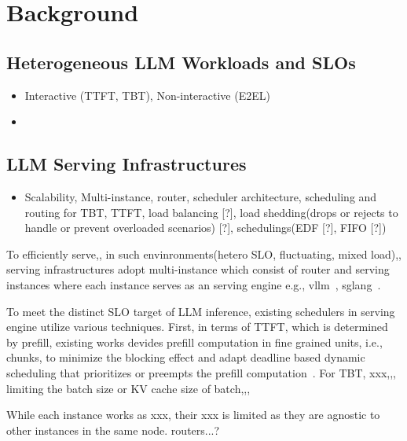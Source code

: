 
\section{Background}
\subsection{Heterogeneous LLM Workloads and SLOs}
\begin{itemize}
    \item Interactive (TTFT, TBT), Non-interactive (E2EL)
    \item {}
\end{itemize}
\subsection{LLM Serving Infrastructures}
\begin{itemize}
    \item Scalability, Multi-instance, router, scheduler architecture, scheduling and routing for TBT, TTFT, load balancing [?], load shedding(drops or rejects to handle or prevent overloaded scenarios) [?], schedulings(EDF [?], FIFO [?])
\end{itemize}
To efficiently serve,, in such envinronments(hetero SLO, fluctuating, mixed load),, serving infrastructures adopt multi-instance which consist of router and serving instances where each instance serves as an serving engine e.g., vllm~\cite{vllm}, sglang~\cite{SGLang}.

To meet the distinct SLO target of LLM inference, existing schedulers in serving engine utilize various techniques. First, in terms of TTFT, which is determined by prefill, existing works devides prefill computation in fine grained units, i.e., chunks, to minimize the blocking effect and adapt deadline based dynamic scheduling that prioritizes or preempts the prefill computation~\cite{QoServe,vllm,jitserve,sarathi_serve, Agentix}.
For TBT, xxx,,, limiting the batch size or KV cache size of batch,,,

While each instance works as xxx, their xxx is limited as they are agnostic to other instances in the same node. routers...?


